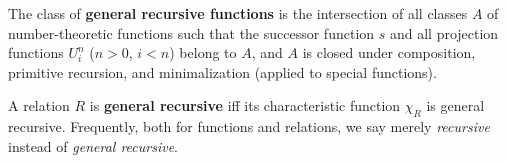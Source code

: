 The class of \textbf{general recursive functions} is the intersection of all classes $A$ of number-theoretic functions such that the successor function $s$ and all projection functions $U_i^n$ ($n > 0$, $i < n$) belong to $A$, and $A$ is closed under composition, primitive recursion, and minimalization (applied to special functions).

A relation $R$ is \textbf{general recursive} iff its characteristic function $\chi_R$ is general recursive. Frequently, both for functions and relations, we say merely \textit{recursive} instead of \textit{general recursive}.
